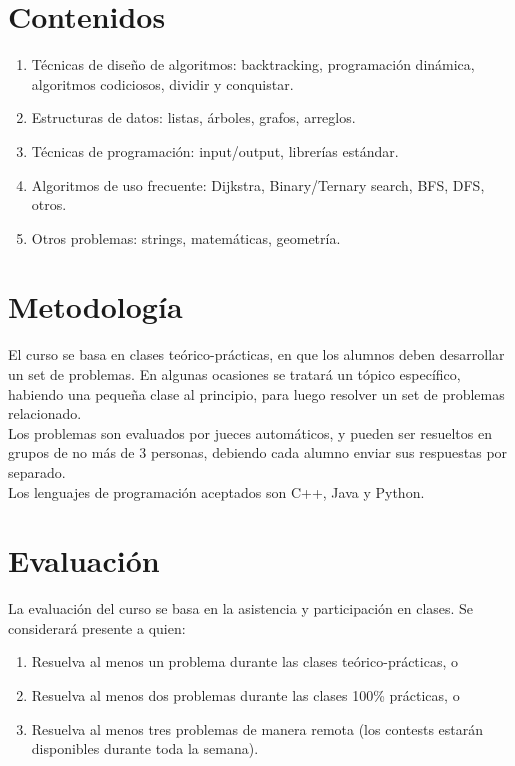 \documentclass[10pt,letterpaper]{extarticle}
\begin{document}
\section*{Contenidos}
\begin{enumerate}
  \item Técnicas de diseño de algoritmos: backtracking, programación dinámica,
	algoritmos codiciosos, dividir y conquistar.
	\item Estructuras de datos: listas, árboles, grafos, arreglos.
	\item Técnicas de programación: input/output, librerías estándar.
	\item Algoritmos de uso frecuente: Dijkstra, Binary/Ternary search, BFS, DFS, otros.
	\item Otros problemas: strings, matemáticas, geometría.
\end{enumerate}

\section*{Metodología}
\noindent
El curso se basa en clases teórico-prácticas, en que los alumnos deben desarrollar
un set de problemas. En algunas ocasiones se tratará un tópico específico, habiendo una
pequeña clase al principio, para luego resolver un set de problemas relacionado.\\

\noindent
Los problemas son evaluados por jueces automáticos, y pueden ser resueltos en grupos
de no más de 3 personas, debiendo cada alumno enviar sus respuestas por separado.\\

\noindent
Los lenguajes de programación aceptados son C++, Java y Python.

\section*{Evaluación}
\noindent
La evaluación del curso se basa en la asistencia y participación en clases. Se
considerará presente a quien:

\begin{enumerate}
	\item Resuelva al menos un problema durante las clases teórico-prácticas, o
	\item Resuelva al menos dos problemas durante las clases 100\% prácticas, o
	\item Resuelva al menos tres problemas de manera remota (los contests estarán disponibles durante toda la semana).
\end{enumerate}
\end{document}
